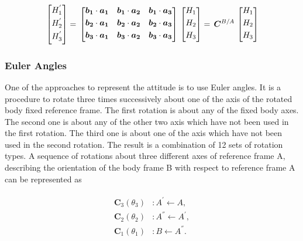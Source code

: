 \begin{equation}{\label{transformVectorH}}
\begin{bmatrix}
H_1^{'}\\[0.3em]
H_2^{'}\\[0.3em]
H_3^{'}\\[0.3em]
\end{bmatrix}
=\,
\begin{bmatrix}
 \bm{b_1} \cdot \bm{a_1}  &  \bm{b_1} \cdot \bm{a_2}  &  \bm{b_1} \cdot \bm{a_3} \\[0.3em]
 \bm{b_2} \cdot \bm{a_1}  & \bm{b_2} \cdot \bm{a_2}  & \bm{b_2} \cdot \bm{a_3} \\[0.3em]
 \bm{b_3} \cdot \bm{a_1}  & \bm{b_3} \cdot \bm{a_2}  &  \bm{b_3} \cdot \bm{a_3} \\[0.3em]
\end{bmatrix}
\,
\begin{bmatrix}
 H_1\\[0.3em]
 H_2\\[0.3em]
 H_3\\[0.3em]
\end{bmatrix}
=\,
\bm{C}^{B/A}
\,
\begin{bmatrix}
H_1\\[0.3em]
H_2\\[0.3em]
H_3\\[0.3em]
\end{bmatrix}
\end{equation} 

\subsubsection{Euler Angles}

One of the approaches to represent the attitude is to use Euler angles. 
It is a procedure to rotate three times successively about one of the axis of the rotated body fixed reference frame. 
The first rotation is about any of the fixed body axes. 
The second one is about any of the other two axis which have not been used in the first rotation. 
The third one is about one of the axis which have not been used in the second rotation. 
The result is a combination of 12 sets of rotation types. 
A sequence of rotations about three different axes of reference frame A, describing the orientation of the body frame B with respect to reference frame A can be represented as

\begin{align}
\label{eqn:sequence}
\begin{split}
{\bm{C}}_3(\theta_{3}) & :      A^{'} \leftarrow A   ,
\\
{\bm{C}}_2(\theta_{2}) & :      A^{''} \leftarrow A^{'}   ,
\\
{\bm{C}}_1(\theta_{1}) & :      B \leftarrow A^{''}  .
\end{split}
\end{align}

